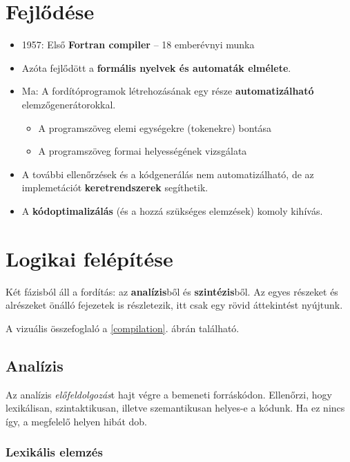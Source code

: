 \section{Fejlődése}


\begin{itemize}
	\item 1957: Első \textbf{Fortran compiler} -- 18 emberévnyi munka
	\item Azóta fejlődött a \textbf{formális nyelvek és automaták elmélete}.
	\item Ma: A fordítóprogramok létrehozásának egy része \textbf{automatizálható} elemzőgenerátorokkal.
	\begin{itemize}
		\item A programszöveg elemi egységekre (tokenekre) bontása
		\item A programszöveg formai helyességének vizsgálata
	\end{itemize}
	\item A további ellenőrzések és a kódgenerálás nem automatizálható, de az implemetációt \textbf{keretrendszerek} segíthetik.
	\item A \textbf{kódoptimalizálás} (és a hozzá szükséges elemzések) komoly kihívás.
\end{itemize}

\section{Logikai felépítése}

Két fázisból áll a fordítás: az \textbf{analízis}ből és \textbf{szintézis}ből. Az egyes részeket és alrészeket önálló fejezetek is részletezik, itt csak egy rövid áttekintést nyújtunk.

A vizuális összefoglaló a \ref{compilation}. ábrán található.

\subsection{Analízis}

Az analízis \textit{előfeldolgozás}t hajt végre a bemeneti forráskódon. Ellenőrzi, hogy lexikálisan, szintaktikusan, illetve szemantikusan helyes-e a kódunk. Ha ez nincs így, a megfelelő helyen hibát dob.

\subsubsection{Lexikális elemzés}

